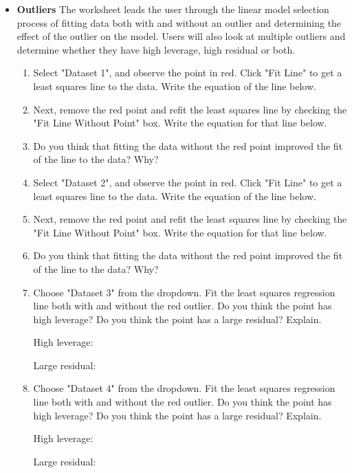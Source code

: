 \documentclass[11pt]{book}
\begin{document}
\begin{itemize}
\item {\bf Outliers} The worksheet leads the user through the linear model selection process of fitting data both with and without an outlier and determining the effect of the outlier on the model. Users will also look at multiple outliers and determine whether they have high leverage, high residual or both.

\begin{enumerate}

\item Select "Dataset 1", and observe the point in red. Click "Fit Line" to get a least squares line to the data. Write the equation of the line below.

\item Next, remove the red point and refit the least squares line by checking the "Fit Line Without Point" box.  Write the equation for that line below. 

\item Do you think that fitting the data without the red point improved the fit of the line to the data? Why?

\item Select "Dataset 2", and observe the point in red. Click "Fit Line" to get a least squares line to the data. Write the equation of the line below.

\item Next, remove the red point and refit the least squares line by checking the "Fit Line Without Point" box.  Write the equation for that line below. 

\item Do you think that fitting the data without the red point improved the fit of the line to the data? Why?

\item Choose "Dataset 3" from the dropdown. Fit the least squares regression line both with and without the red outlier. Do you think the point has high leverage? Do you think the point has a large residual? Explain.

High leverage:

Large residual:

\item Choose "Dataset 4" from the dropdown. Fit the least squares regression line both with and without the red outlier. Do you think the point has high leverage? Do you think the point has a large residual? Explain.

High leverage:

Large residual:


\end{enumerate}
\end{itemize}
\end{document}
